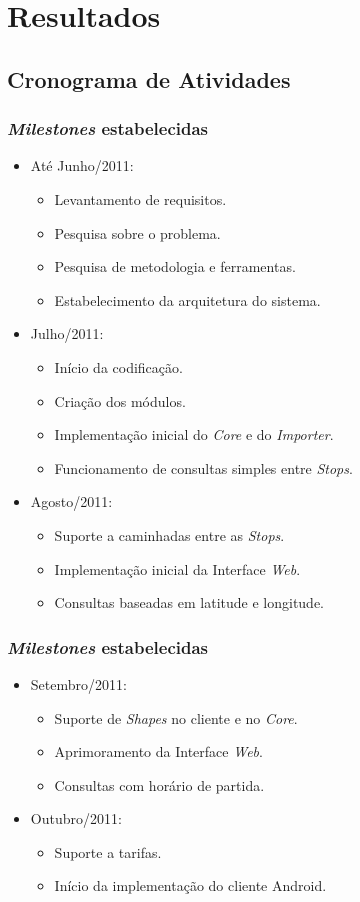 \section{Resultados}

\subsection{Cronograma de Atividades}
\frame
{
\frametitle{\emph{Milestones} estabelecidas}
\begin{itemize}
	\item Até Junho/2011:
	\begin{itemize}
		\item Levantamento de requisitos.
		\item Pesquisa sobre o problema.
		\item Pesquisa de metodologia e ferramentas.
		\item Estabelecimento da arquitetura do sistema.
	\end{itemize}
	\item Julho/2011:
	\begin{itemize}
		\item Início da codificação.
		\item Criação dos módulos.
		\item Implementação inicial do \emph{Core} e do \emph{Importer}.
		\item Funcionamento de consultas simples entre \emph{Stops}.
	\end{itemize}
	\item Agosto/2011:
	\begin{itemize}
		\item Suporte a caminhadas entre as \emph{Stops}.
		\item Implementação inicial da Interface \emph{Web}.
		\item Consultas baseadas em latitude e longitude.
	\end{itemize}
\end{itemize}
}
\frame
{
\frametitle{\emph{Milestones} estabelecidas}
\begin{itemize}
	\item Setembro/2011:
	\begin{itemize}
		\item Suporte de \emph{Shapes} no cliente e no \emph{Core}.
		\item Aprimoramento da Interface \emph{Web}.
		\item Consultas com horário de partida.
	\end{itemize}
	\item Outubro/2011:
	\begin{itemize}
		\item Suporte a tarifas.
		\item Início da implementação do cliente Android.
	\end{itemize}
\end{itemize}
}

